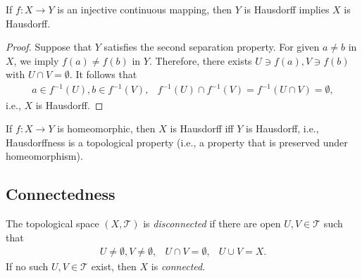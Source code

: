\begin{proposition}
If $f:X\to Y$ is an injective continuous mapping, then $Y$ is Hausdorff implies $X$ is Hausdorff.
\end{proposition}
\begin{proof}
Suppose that $Y$ satisfies the second separation property. For given $a\ne b$ in $X$, we imply $f(a)\ne f(b)$ in $Y$. Therefore, there exists $U\ni f(a),V\ni f(b)$ with $U\cap V=\emptyset$. It follows that
\[
\begin{array}{ll}
a\in f^{-1}(U),b\in f^{-1}(V),
&
f^{-1}(U)\cap f^{-1}(V) = f^{-1}(U\cap V)=\emptyset,
\end{array}
\]
i.e., $X$ is Hausdorff.
\end{proof}

\begin{corollary}
If $f:X\to Y$ is homeomorphic, then $X$ is Hausdorff iff $Y$ is Hausdorff, i.e., 
Hausdorffness is a topological property 
(i.e., a property that is preserved under homeomorphism).
\end{corollary}

\subsection{Connectedness}
\begin{definition}[Connected]
The topological space $(X,\mathcal{T})$ is \emph{disconnected} if there are open $U,V\in\mathcal{T}$ such that
\begin{equation}\label{Eq:3:13}
\begin{array}{lll}
U\ne\emptyset,
V\ne\emptyset,
&
U\cap V=\emptyset,
&
U\cup V = X.
\end{array}
\end{equation}
If no such $U,V\in\mathcal{T}$ exist, then $X$ is \emph{connected}.
\end{definition}

